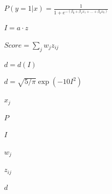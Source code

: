 
$P(y=1|x)=\frac{1}{1+e^{-(\beta_0+\beta_1x_1+\dots+\beta_kx_k)}}$

$I=a\cdot z$

$Score=\sum_j w_j z_{ij}$

$d=d(I)$

$d=\sqrt{5/\pi}\exp(-10 I^2)$

$x_j$

$P$

$I$

$w_j$

$z_{ij}$

$d$
